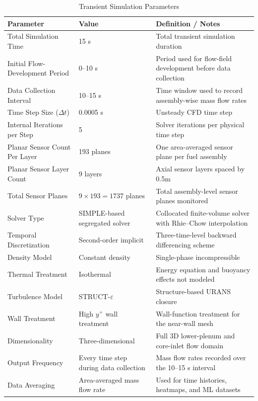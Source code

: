 \documentclass[review]{elsarticle}
\theoremstyle{definition}
\theoremstyle{definition}
\theoremstyle{remark}
\begin{document}
\begin{table}[h!]
\centering
\caption{Transient Simulation Parameters}
\label{tab:transient}
\renewcommand{\arraystretch}{1.2}
\begin{tabularx}{\textwidth}{|l|l|X|}
\hline
\textbf{Parameter} & \textbf{Value} & \textbf{Definition / Notes} \\
\hline
Total Simulation Time & 15 s & Total transient simulation duration \\
\hline
Initial Flow-Development Period & 0--10 s & Period used for flow-field development before data collection \\
\hline
Data Collection Interval & 10--15 s & Time window used to record assembly-wise mass flow rates \\
\hline
Time Step Size ($\Delta t$) & 0.0005 s & Unsteady CFD time step \\
\hline
Internal Iterations per Step & 5 & Solver iterations per physical time step \\
\hline
Planar Sensor Count Per Layer & 193 planes & One area-averaged sensor plane per fuel assembly \\
\hline
Planar Sensor Layer Count & 9 layers & Axial sensor layers spaced by 0.5m \\
\hline
Total Sensor Planes & $9 \times 193 = 1737$ planes & Total assembly-level sensor planes monitored \\
\hline
Solver Type & SIMPLE-based segregated solver & Collocated finite-volume solver with Rhie--Chow interpolation \\
\hline
Temporal Discretization & Second-order implicit & Three-time-level backward differencing scheme \\
\hline
Density Model & Constant density & Single-phase incompressible \\
\hline
Thermal Treatment & Isothermal & Energy equation and buoyancy effects not modeled \\
\hline
Turbulence Model & STRUCT-$\varepsilon$ & Structure-based URANS closure \\
\hline
Wall Treatment & High $y^{+}$ wall treatment & Wall-function treatment for the near-wall mesh \\
\hline
Dimensionality & Three-dimensional & Full 3D lower-plenum and core-inlet flow domain \\
\hline
Output Frequency & Every time step during data collection & Mass flow rates recorded over the 10--15 s interval \\
\hline
Data Averaging & Area-averaged mass flow rate & Used for time histories, heatmaps, and ML datasets \\
\hline
\end{tabularx}
\end{table}
\end{document}

